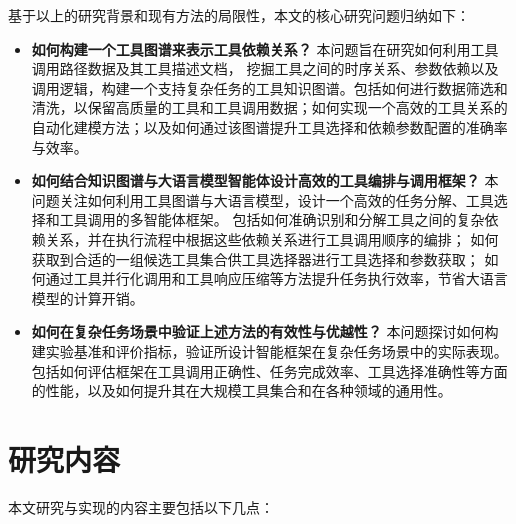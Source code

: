 基于以上的研究背景和现有方法的局限性，本文的核心研究问题归纳如下：
\begin{itemize}
    \item \textbf{如何构建一个工具图谱来表示工具依赖关系？}  
    本问题旨在研究如何利用工具调用路径数据及其工具描述文档，
    挖掘工具之间的时序关系、参数依赖以及调用逻辑，构建一个支持复杂任务的工具知识图谱。包括如何进行数据筛选和清洗，以保留高质量的工具和工具调用数据；如何实现一个高效的工具关系的自动化建模方法；以及如何通过该图谱提升工具选择和依赖参数配置的准确率与效率。
    
    \item \textbf{如何结合知识图谱与大语言模型智能体设计高效的工具编排与调用框架？}  
    本问题关注如何利用工具图谱与大语言模型，设计一个高效的任务分解、工具选择和工具调用的多智能体框架。
    包括如何准确识别和分解工具之间的复杂依赖关系，并在执行流程中根据这些依赖关系进行工具调用顺序的编排；
    如何获取到合适的一组候选工具集合供工具选择器进行工具选择和参数获取；
    如何通过工具并行化调用和工具响应压缩等方法提升任务执行效率，节省大语言模型的计算开销。
    
    \item \textbf{如何在复杂任务场景中验证上述方法的有效性与优越性？}  
    本问题探讨如何构建实验基准和评价指标，验证所设计智能框架在复杂任务场景中的实际表现。包括如何评估框架在工具调用正确性、任务完成效率、工具选择准确性等方面的性能，以及如何提升其在大规模工具集合和在各种领域的通用性。
\end{itemize}

\section{研究内容}

本文研究与实现的内容主要包括以下几点：

